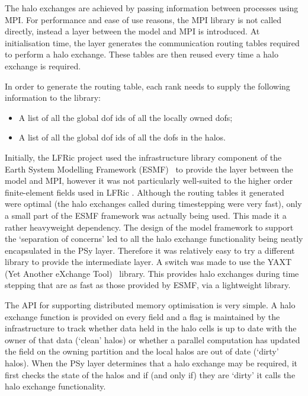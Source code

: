 \documentclass[review,times]{elsarticle}
\begin{document}
The halo exchanges are achieved by passing information between processes 
using MPI. For performance and ease of use reasons, the MPI library is not 
called directly, instead a layer between the model and MPI is introduced. 
At initialisation time, the layer generates the 
communication routing tables required to perform a halo
exchange. These tables  
are then reused every time a halo exchange is required.

In order to generate the routing table, each rank needs to supply the
following information to the library:

\begin{itemize}

\item A list of all the global dof ids of all the locally owned dofs;

\item A list of all the global dof ids of all the dofs in the halos.

\end{itemize}

Initially, the LFRic project used the infrastructure library component
of the Earth System Modelling Framework (ESMF)~\cite{ESMFDocs} to
provide the layer between the model and MPI, however it was not particularly
well-suited to the higher order finite-element fields used in LFRic . Although
the routing tables it generated were optimal (the halo exchanges called
during timestepping were very fast), only a small part of the ESMF framework
was actually being used. This made it a rather heavyweight dependency.
The design of the model framework to support the `separation of concerns'
led to all the halo exchange functionality being neatly encapsulated in
the PSy layer. Therefore it was relatively easy to try a different library
to provide the intermediate layer. A switch was made to use the YAXT
(Yet Another eXchange Tool)~\cite{YAXTDocs} library. This provides
halo exchanges during time stepping that are as fast as those provided
by ESMF, via a lightweight library.

The API for supporting distributed memory optimisation is very simple. A
halo exchange function is provided on every field and a flag is
maintained by the infrastructure to track whether data held in the halo
cells is up to date with the owner of that data (`clean' halos) or
whether a parallel computation has updated the field on the owning
partition and the local halos are out of date (`dirty' halos). When the
PSy layer determines that a halo exchange may be required, it first
checks the state of the halos and if (and only if) they are `dirty' it 
calls the halo exchange functionality.
\end{document}
